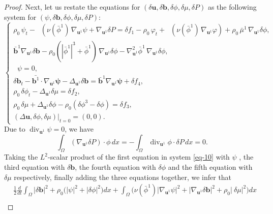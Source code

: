 \documentclass[11pt]{article}
\numberwithin{equation}{section}
\begin{document}
\begin{proof}
Next, let us restate the equations for $(\delta \mathbf{u}, \delta \mathbf{b}, \delta \phi,\delta \mu, \delta P)$ as the following system for $(\psi, \delta \mathbf{b}, \delta \phi,\delta\mu, \delta P)$:
\begin{equation}
\begin{cases}
\rho_0 \,\psi_t - \mathop{\mathrm{div}_{\mathbf{u}^1}} \left( \nu(\bar{\phi}^1) \, \nabla_{\mathbf{u}^1} \psi + \nabla_{\mathbf{u}^1} \delta P \right.
= \delta f_1-\rho_0 \,\varphi_t+\mathop{\mathrm{div}_{\mathbf{u}^1}} \left( \nu(\bar{\phi}^1) \, \nabla_{\mathbf{u}^1} \varphi \right)+\rho_0 \, \bar{\mu}^1 \, \nabla_{\mathbf{u}^1} \delta \phi, \label{eq-10}\\
\bar{\mathbf{b}}^1\nabla_{\mathbf{u}^1} \delta\mathbf{b}- \rho_0 \left( |\bar{\phi}^1|^3 + \bar{\phi}^1 \right) \, \nabla_{\mathbf{u}^1} \delta \phi
-\nabla_{\mathbf{u}^1}^2 \bar{\phi}^1 \, \nabla_{\mathbf{u}^1} \delta \phi, \\
\mathop{\mathrm{div}_{\mathbf{u}^1}} \psi = 0, \\
\delta \mathbf{b}_t -\bar{\mathbf{b}^1}\cdot\nabla_{\mathbf{u}^1} \mathbf{\psi}-\Delta_{\mathbf{u}^1}\delta \mathbf{b}=\bar{\mathbf{b}}^1\nabla_{\mathbf{u}^1} \mathbf{\psi}+\delta f_4,\\
\rho_0 \, \delta \phi_t - \Delta_{\mathbf{u}^1} \delta \mu = \delta f_2, \\
\rho_0 \, \delta \mu + \Delta_{\mathbf{u}^1} \delta \phi - \rho_0 \left( \delta \phi^3 - \delta \phi \right) = \delta f_3, \\
(\Delta \mathbf{u}, \delta \phi, \delta \mu) \big\vert_{t=0}= (0, 0).
\end{cases}
\end{equation}
Due to $\operatorname{div}_{\mathbf{u}^1} \psi = 0$, we have
\[
\int_{\Omega} (\nabla_{\mathbf{u}^1} \delta P) \cdot \phi \, dx = - \int_{\Omega} \operatorname{div}_{\mathbf{u}^1} \phi \cdot \delta P \, dx = 0.
\]
Taking the \( L^2 \)-scalar product of the first equation in system \eqref{eq-10} with \( \psi \) , the third equation with \( \delta\mathbf{b} \), the fourth equation with \( \delta \phi \) and the fifth equation with \( \delta \mu \) respectively, finally adding the three equations together, we infer that
\begin{equation}
\begin{split}
&\frac{1}{2} \frac{d}{dt} \int_{\Omega}|\delta\mathbf{b}|^2+ \rho_0 \big( |\psi|^2 + |\delta \phi|^2 \big) dx + \int_{\Omega} \big( \nu(\bar{\phi}^1) |\nabla_{\mathbf{u}^1} \psi|^2 +|\nabla_{\mathbf{u}^1}\delta\mathbf{b}|^2 + \rho_0 |\ \delta \mu|^2 \big) dx \\

\end{split}
\end{equation}
\end{proof}
\end{document}
